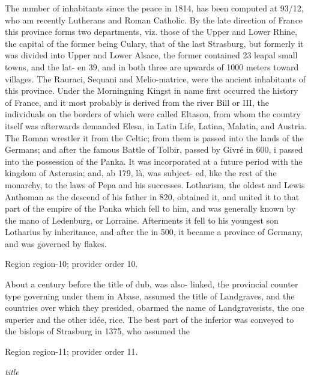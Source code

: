 \documentclass[11pt]{article}
\begin{document}
The number of inhabitants since the peace in 1814, has been computed at 93/12, who am recently Lutherans and Roman Catholic. By the late direction of France this province forms two departments, viz. those of the Upper and Lower Rhine, the capital of the former being Culary, that of the last Strasburg, but formerly it was divided into Upper and Lower Alsace, the former contained 23 leapal small towns, and the lat- en 39, and in both three are upwards of 1000 meters toward villages. The Rauraci, Sequani and Melio-matrice, were the ancient inhabitants of this province. Under the Morningning Kingst in name first occurred the history of France, and it most probably is derived from the river Bill or III, the individuals on the borders of which were called Eltason, from whom the country itself was afterwards demanded Elesa, in Latin Life, Latina, Malatia, and Austria. The Roman wrestler it from the Celtic; from them is passed into the lands of the Germans; and after the famous Battle of Tolbir, passed by Givré in 600, i passed into the possession of the Panka. It was incorporated at a future period with the kingdom of Asterasia; and, ab 179, là, was subject- ed, like the rest of the monarchy, to the laws of Pepa and his successes. Lotharism, the oldest and Lewis Anthoman as the descend of his father in 820, obtained it, and united it to that part of the empire of the Panka which fell to him, and was generally known by the mano of Ledenburg, or Lorraine. Afterments it fell to his youngest son Lotharius by inheritance, and after the in 500, it became a province of Germany, and was governed by flakes.
\par

{\scriptsize\color{gray} Region region-10; provider order 10.\par}
\medskip

About a century before the title of dub, was also- linked, the provincial counter type governing under them in Abase, assumed the title of Landgraves, and the countries over which they presided, obarmed the name of Landgravesists, the one superier and the other idée, rice. The best part of the inferior was conveyed to the bislops of Strasburg in 1375, who assumed the
\par

{\scriptsize\color{gray} Region region-11; provider order 11.\par}
\medskip

{\small\itshape title\par}
\end{document}
